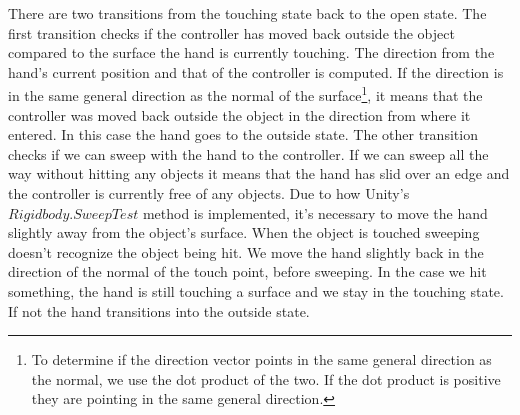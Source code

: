 There are two transitions from the touching state back to the open state. The first transition checks if the controller has moved back outside the object compared to the surface the hand is currently touching. The direction from the hand's current position and that of the controller is computed. If the direction is in the same general direction as the normal of the surface\footnote{To determine if the direction vector points in the same general direction as the normal, we use the dot product of the two. If the dot product is positive they are pointing in the same general direction.}, it means that the controller was moved back outside the object in the direction from where it entered. In this case the hand goes to the outside state. The other transition checks if we can sweep with the hand to the controller. If we can sweep all the way without hitting any objects it means that the hand has slid over an edge and the controller is currently free of any objects. Due to how Unity's $Rigidbody.SweepTest$ method is implemented, it's necessary to move the hand slightly away from the object's surface. When the object is touched sweeping doesn't recognize the object being hit. We move the hand slightly back in the direction of the normal of the touch point, before sweeping. In the case we hit something, the hand is still touching a surface and we stay in the touching state. If not the hand transitions into the outside state.

